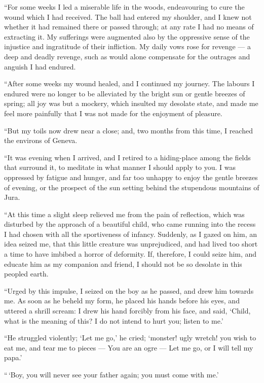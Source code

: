 ``For some weeks I led a miserable
life in the woods, endeavouring to cure
the wound which I had received. The
ball had entered my shoulder, and I
knew not wheth\-er it had remained
there or passed through; at any rate
I had no means of extracting it. My
sufferings were augmented also by the
oppressive sense of the injustice and
ingratitude of their infliction. My
daily vows rose for revenge --- a deep
and deadly revenge, such as would
alone compensate for the outrages and
anguish I had endured.

``After some weeks my wound
healed, and I continued my journey.
The labours I endured were no longer
to be alleviated by the bright sun or
gentle breezes of spring; all joy was
but a mockery, which insulted my desolate
state, and made me feel more
painfully that I was not made for the
enjoyment of pleasure.

``But my toils now drew near a
close; and, two months from this time,
I reached the environs of Geneva.

``It was evening when I arrived,
and I retired to a hiding-place among
the fields that surround it, to meditate
in what manner I should apply to you.
I was oppressed by fatigue and hunger,
and far too unhappy to enjoy the gentle
breezes of evening, or the prospect of
the sun setting behind the stupendous
mountains of Jura.

``At this time a slight sleep relieved
me from the pain of reflection, which
was disturbed by the approach of a
beautiful child, who came running into
the recess I had chosen with all the
sportiveness of infancy. Suddenly, as
I gazed on him, an idea seized me, that
this little creature was unprejudiced,
and had lived too short a time to have
imbibed a horror of deformity. If,
therefore, I could seize him, and educate
him as my companion and friend,
I should not be so desolate in this peopled
earth.

``Urged by this impulse, I seized on
the boy as he passed, and drew him towards
me. As soon as he beheld my
form, he placed his hands before his
eyes, and uttered a shrill scream: I
drew his hand forcibly from his face,
and said, `Child, what is the meaning
of this? I do not intend to hurt you;
listen to me.'

``He struggled violently; `Let me
go,' he cried; `monster! ugly wretch!
you wish to eat me, and tear me to
pieces --- You are an ogre --- Let me go,
or I will tell my papa.'

``\,`Boy, you will never see your father
again; you must come with me.'

